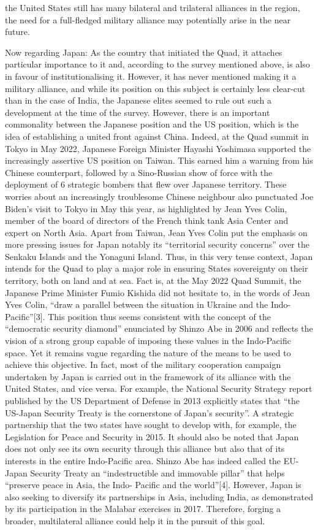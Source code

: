 \documentclass[11pt,a4paper]{article}
\begin{document}
the United States still has many bilateral and trilateral alliances in the region, the need for a full-fledged military alliance may potentially arise in the near future.

Now regarding Japan: As the country that initiated the Quad, it attaches particular importance to it and, according to the survey mentioned above, is also in favour of institutionalising it. However, it has never mentioned making it a military alliance, and while its position on this subject is certainly less clear-cut than in the case of India, the Japanese elites seemed to rule out such a development at the time of the survey. However, there is an important commonality between the Japanese position and the US position, which is the idea of establishing a united front against China. Indeed, at the Quad summit in Tokyo in May 2022, Japanese Foreign Minister Hayashi Yoshimasa supported the increasingly assertive US position on Taiwan. This earned him a warning from his Chinese counterpart, followed by a Sino-Russian show of force with the deployment of 6 strategic bombers that flew over Japanese territory. These worries about an increasingly troublesome Chinese neighbour also punctuated Joe Biden’s visit to Tokyo in May this year, as highlighted by Jean Yves Colin, member of the board of directors of the French think tank Asia Center and expert on North Asia. Apart from Taiwan, Jean Yves Colin put the emphasis on more pressing issues for Japan notably its “territorial security concerns” over the Senkaku Islands and the Yonaguni Island. Thus, in this very tense context, Japan intends for the Quad to play a major role in ensuring States sovereignty on their territory, both on land and at sea. Fact is, at the May 2022 Quad Summit, the Japanese Prime Minister Fumio Kishida did not hesitate to, in the words of Jean Yves Colin, “draw a parallel between the situation in Ukraine and the Indo-Pacific”{[}3{]}. This position thus seems consistent with the concept of the “democratic security diamond” enunciated by Shinzo Abe in 2006 and reflects the vision of a strong group capable of imposing these values in the Indo-Pacific space. Yet it remains vague regarding the nature of the means to be used to achieve this objective. In fact, most of the military cooperation campaign undertaken by Japan is carried out in the framework of its alliance with the United States, and vice versa. For example, the National Security Strategy report published by the US Department of Defense in 2013 explicitly states that “the US-Japan Security Treaty is the cornerstone of Japan’s security”. A strategic partnership that the two states have sought to develop with, for example, the Legislation for Peace and Security in 2015. It should also be noted that Japan does not only see its own security through this alliance but also that of its interests in the entire Indo-Pacific area. Shinzo Abe has indeed called the EU-Japan Security Treaty an “indestructible and immovable pillar” that helps “preserve peace in Asia, the Indo- Pacific and the world”{[}4{]}. However, Japan is also seeking to diversify its partnerships in Asia, including India, as demonstrated by its participation in the Malabar exercises in 2017. Therefore, forging a broader, multilateral alliance could help it in the pursuit of this goal.
\end{document}

